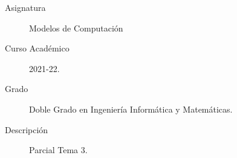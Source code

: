 \documentclass[12pt]{article}
\begin{document}

    
    

    \begin{description}
        \item[Asignatura] Modelos de Computación
        \item[Curso Académico] 2021-22.
        \item[Grado] Doble Grado en Ingeniería Informática y Matemáticas.
        \item[Descripción] Parcial Tema 3.
    \end{description}
    \newpage
    
\end{document}
